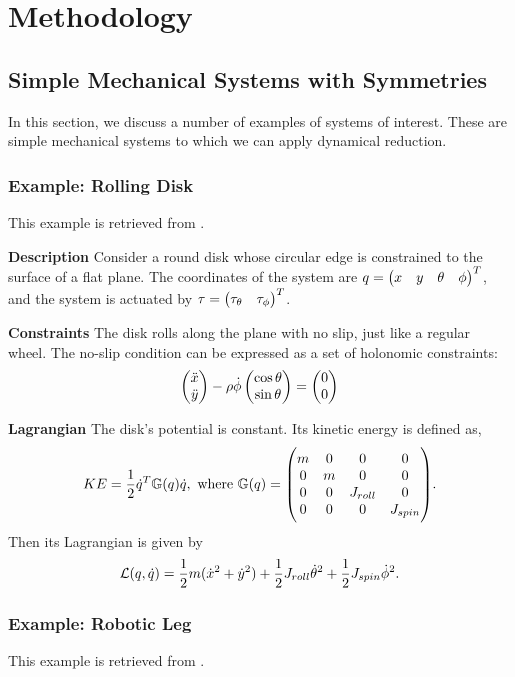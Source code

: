 \documentclass[main.tex]{subfiles}
\begin{document}
\chapter{Methodology}
\section{Simple Mechanical Systems with Symmetries}
In this section, we discuss a number of examples of systems of interest. These are simple mechanical systems to which we can apply dynamical reduction.
\subsection{Example: Rolling Disk}
This example is retrieved from \cite[9]{bullo2019geometric}.

\textbf{Description} Consider a round disk whose circular edge is constrained to the surface of a flat plane. The coordinates of the system are $q=\pmqty{x&y&\theta&\phi}^T$, and the system is actuated by $\tau=\pmqty{\tau_\theta&\tau_\phi}^T$.

\textbf{Constraints} The disk rolls along the plane with no slip, just like a regular wheel. The no-slip condition can be expressed as a set of holonomic constraints:
\begin{align}
    \pmqty{\ddot{x}\\\ddot{y}}-\rho\dot{\phi}\pmqty{\cos\theta\\\sin\theta}=\pmqty{\zmat{2}{1}}
\end{align}

\textbf{Lagrangian} The disk's potential is constant. Its kinetic energy is defined as,
\begin{align}
    KE = \frac{1}{2}\dot q^T \mathbb{G}(q) \dot q, \textrm{ where  }\mathbb{G}(q)=
\mqty(\dmat[0]{m,m,J_{roll},J_{spin}}).
\end{align}
Then its Lagrangian is given by
\begin{align}
    \mathcal{L}(q,\dot q)=\frac{1}{2}m(\dot x^2+\dot y^2)+\frac{1}{2}J_{roll}\dot\theta^2+\frac{1}{2}J_{spin}\dot{\phi}^2.
\end{align}

\subsection{Example: Robotic Leg} 
This example is retrieved from \cite[293]{bullo2019geometric}.%
\end{document}
